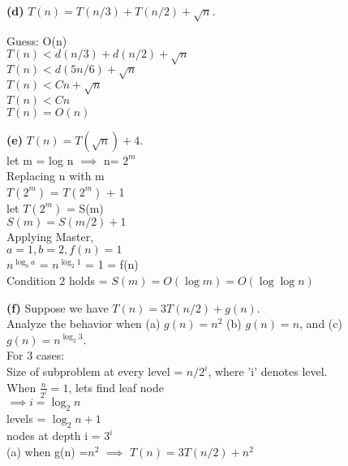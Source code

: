 \documentclass[11pt]{article}
\renewcommand\part[1]{\vspace{.10in}\textbf{(#1)}}
\begin{document}
\part{d} $T(n) = T(n/3) + T(n/2) + \sqrt{n}$.

Guess: O(n)
\\$T(n)<d(n/3) + d(n/2) + \sqrt{n}$
\\$T(n)<d(5n/6) + \sqrt{n}$
\\$T(n)<Cn + \sqrt{n}$
\\$T(n)<Cn$
\\$T(n)=O(n)$

\part{e} $T(n) = T(\sqrt{n}) + 4$.
\\let m = log n $\implies$ n= $2^m$
\\Replacing n with m
\\$T(2^m)$ = $T(2^m)$ + 1
\\let $T(2^m)$ = S(m)
\\ $S(m) = S(m/2) + 1$
\\Applying Master,
\\$a=1,b=2,f(n)=1$
\\$n^{\log_{b}a}$ = $n^{\log_{2}1}$ = 1 = f(n)
\\Condition 2 holds = 
$ S(m) =O(\log m) = O(\log \log n)$

\part{f} Suppose we have $T(n) = 3T(n/2) + g(n)$.
\\ Analyze the behavior when (a) $g(n) = n^2$ (b) $g(n) = n$, and (c) $g(n) = n^{\log_2 3}$.
\\ For 3 cases: 
\\ Size of subproblem at every level = $n/2^i$, where 'i' denotes level. 
\\ When $\frac{n}{2^i} = 1 $, lets find leaf node
\\$\implies i=\log_{2} n$
\\ levels = $\log_{2} n + 1$
\\ nodes at depth i = $3^i$
\\[10pt] (a) when g(n) =$n^2$
$\implies$ $T(n) = 3T(n/2) + n^2$
\end{document}
